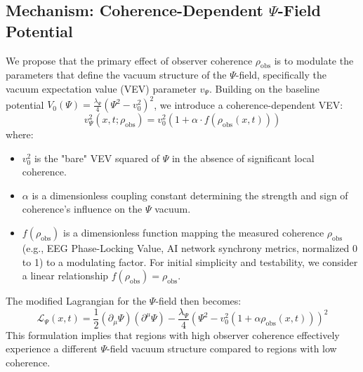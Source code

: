 \documentclass[11pt, a4paper]{book}
\begin{document}
\subsection{Mechanism: Coherence-Dependent $\Psi$-Field Potential}
\label{ssec:coherencemodulation_mechanism}
We propose that the primary effect of observer coherence $\rho_{\text{obs}}$ is to modulate the parameters that define the vacuum structure of the $\Psi$-field, specifically the vacuum expectation value (VEV) parameter $v_\Psi$. Building on the baseline potential $V_0(\Psi) = \frac{\lambda_\Psi}{4}(\Psi^2 - v_0^2)^2$, we introduce a coherence-dependent VEV:
\[ v_\Psi^2(x,t; \rho_{\text{obs}}) = v_0^2 \left(1 + \alpha \cdot f(\rho_{\text{obs}}(x,t))\right) \]
where:
\begin{itemize}
    \item $v_0^2$ is the "bare" VEV squared of $\Psi$ in the absence of significant local coherence.
    \item $\alpha$ is a dimensionless coupling constant determining the strength and sign of coherence's influence on the $\Psi$ vacuum.
    \item $f(\rho_{\text{obs}})$ is a dimensionless function mapping the measured coherence $\rho_{\text{obs}}$ (e.g., EEG Phase-Locking Value, AI network synchrony metrics, normalized 0 to 1) to a modulating factor. For initial simplicity and testability, we consider a linear relationship $f(\rho_{\text{obs}}) = \rho_{\text{obs}}$.
\end{itemize}
The modified Lagrangian for the $\Psi$-field then becomes:
\[ \mathcal{L}_\Psi(x,t) = \frac{1}{2}(\partial_\mu \Psi)(\partial^\mu \Psi) - \frac{\lambda_\Psi}{4}\left(\Psi^2 - v_0^2 (1 + \alpha \rho_{\text{obs}}(x,t))\right)^2 \]
This formulation implies that regions with high observer coherence effectively experience a different $\Psi$-field vacuum structure compared to regions with low coherence.
\end{document}
